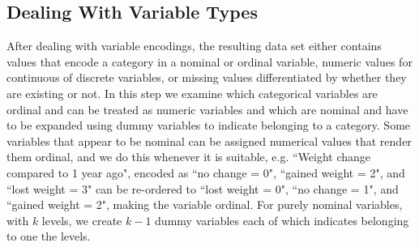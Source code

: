 \documentclass{article}
\begin{document}
\subsection*{Dealing With Variable Types}
After dealing with variable encodings, the resulting data set either contains values that encode a category in a nominal or ordinal variable, numeric values for continuous of discrete variables, or missing values differentiated by whether they are existing or not. In this step we examine which categorical variables are ordinal and can be treated as numeric variables and which are nominal and have to be expanded using dummy variables to indicate belonging to a category. Some variables that appear to be nominal can be assigned numerical values that render them ordinal, and we do this whenever it is suitable, e.g. ``Weight change compared to 1 year ago", encoded as ``no change = 0", ``gained weight = 2", and ``lost weight = 3" can be re-ordered to ``lost weight = 0", ``no change = 1", and ``gained weight = 2", making the variable ordinal. For purely nominal variables, with $k$ levels, we create $k-1$ dummy variables each of which indicates belonging to one the levels. 
\end{document}

